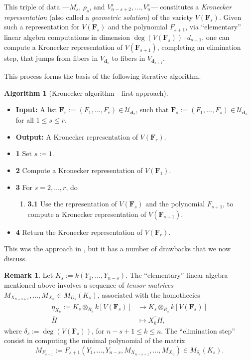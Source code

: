 \documentclass[pdflatex,sn-basic]{sn-jnl}%
\theoremstyle{thmstyleone}%
\theoremstyle{thmstyletwo}%
\theoremstyle{thmstylethree}%
\theoremstyle{definition}
\newtheorem{remark}[theorem]{Remark}
\numberwithin{equation}{section}
\newtheorem{algorithm}[theorem]{Algorithm}
\newcommand{\bfs}{\boldsymbol}
\begin{document}
This triple of data ---$M_s$, $\rho_s$, and
$V_{n-s+2}^s,\ldots,V_n^s$--- constitutes a {\em Kronecker
representation} (also called a {\em geometric solution}) of the
variety $V(\bfs F_s)$. Given such a representation for $V(\bfs F_s)$
and the polynomial $F_{s+1}$, via ``elementary'' linear algebra
computations in dimension $\deg(V(\bfs F_s))\cdot d_{s+1}$, one can
compute a Kronecker representation of $V(\bfs F_{s+1})$, completing
an elimination step, that jumps from fibers in $V_{\bfs d_s}$ to
fibers in $V_{\bfs d_{s+1}}$.

This process forms the basis of the following iterative algorithm.
%
\begin{algorithm}[Kronecker algorithm - first approach]\label{algo: Kronecker - first approach} ${}$
%
\begin{itemize}
\item[]{\bf Input:} A list $\bfs F_r:=(F_1,\ldots,F_r)\in \mathcal{U}_{\bfs
d_r}$, such that $\bfs F_s:=(F_1,\ldots,F_s)\in \mathcal{U}_{\bfs
d_s}$ for all $1\le s\le r$.
%
\item[]{\bf Output:} A Kronecker representation
of $V(\bfs F_r)$. \smallskip

\item[]{\bf 1} Set $s:=1$.
\item[]{\bf 2} Compute a Kronecker representation
of $V(\bfs F_1)$.
\item[]{\bf 3} For $s=2,\ldots,r$, do
  \begin{enumerate}
    \item[]{\bf 3.1} Use the representation of
$V(\bfs F_s)$ and the polynomial $F_{s+1}$,
    to compute a Kronecker
representation of $V(\bfs F_{s+1})$.
  \end{enumerate}
  \item[]{\bf 4} Return the Kronecker representation of $V(\bfs F_r)$.
\end{itemize}
\end{algorithm}

This was the approach in \cite{Kronecker82}, but it has a number of
drawbacks that we now discuss.
%
\begin{remark}
Let $K_s:=\overline{k}(Y_1,\ldots,Y_{n-s})$. The ``elementary''
linear algebra mentioned above involves a sequence of {\em tensor
matrices} $M_{X_{n-s+1}},\ldots,M_{X_n}\in M_{D_s}(K_s)$, associated
with the homothecies
%
\begin{align*}
\eta_{X_k}:=K_s \otimes_{R_s} \overline{k}[V(\bfs F_s)] & \to K_s
\otimes_{R_s} \overline{k}[V(\bfs
F_s)]\\
\overline{H}&\mapsto \overline{X_kH},\end{align*}
%
where $\delta_s:=\deg (V(\bfs F_s))$, for $n-s+1\le k\le n$. The
``elimination step'' consist in computing the minimal polynomial of
the matrix
%
$$M_{F_{s+1}}:=F_{s+1}(Y_1,\ldots,Y_{n-s},M_{X_{n-s+1}},\ldots,M_{X_n})
\in M_{\delta_s}(K_s).$$
\end{remark}
\end{document}
